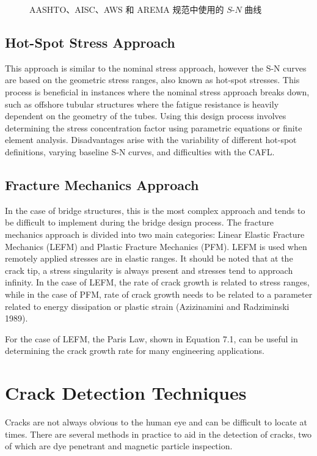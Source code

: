 \begin{figure}
  \caption{AASHTO、AISC、AWS 和 AREMA 规范中使用的 $S$-$N$ 曲线 \cite{aashto2012l}}
  \label{fig:s-n-curve}
\end{figure}


\subsection{Hot-Spot Stress Approach}
This approach is similar to the nominal stress approach, however the S-N curves are based on the geometric
stress ranges, also known as hot-spot stresses. This process is beneficial in instances where the nominal stress
approach breaks down, such as offshore tubular structures where the fatigue resistance is heavily dependent on the
geometry of the tubes. Using this design process involves determining the stress concentration factor using
parametric equations or finite element analysis. Disadvantages arise with the variability of different hot-spot
definitions, varying baseline S-N curves, and difficulties with the CAFL.

\subsection{Fracture Mechanics Approach}
In the case of bridge structures, this is the most complex approach and tends to be difficult to implement during
the bridge design process. The fracture mechanics approach is divided into two main categories: Linear Elastic
Fracture Mechanics (LEFM) and Plastic Fracture Mechanics (PFM). LEFM is used when remotely applied stresses
are in elastic ranges. It should be noted that at the crack tip, a stress singularity is always present and stresses tend to
approach infinity. In the case of LEFM, the rate of crack growth is related to stress ranges, while in the case of PFM,
rate of crack growth needs to be related to a parameter related to energy dissipation or plastic strain (Azizinamini and
Radziminski 1989).

For the case of LEFM, the Paris Law, shown in Equation 7.1, can be useful in determining the crack growth rate
for many engineering applications.

\section{Crack Detection Techniques}
Cracks are not always obvious to the human eye and can be difficult to locate at times. There are several
methods in practice to aid in the detection of cracks, two of which are dye penetrant and magnetic particle inspection.

